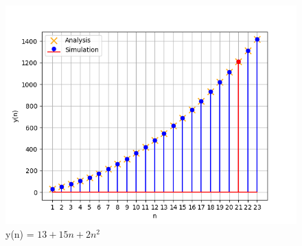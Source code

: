 \documentclass[journal,12pt,twocolumn]{IEEEtran}
\theoremstyle{remark}
\begin{document}
\begin{figure}[h]
  \centering
  \includegraphics[width=\columnwidth]{ncert-maths/11/9/5/6/figs/fig1.png}
  \caption{y(n) = $13 + 15n+2n^2$}
  \label{fig:graph}
\end{figure}
\end{document}
